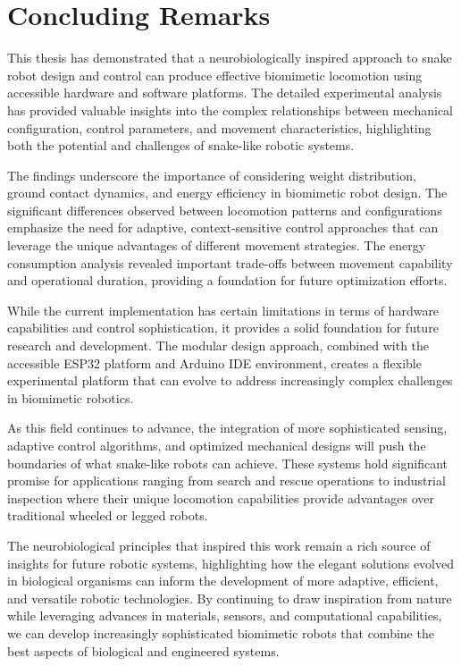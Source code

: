 \documentclass[12pt,a4paper]{report}
\begin{document}
\section{Concluding Remarks}
\label{sec:concludingRemarks}

This thesis has demonstrated that a neurobiologically inspired approach to snake robot design and control can produce effective biomimetic locomotion using accessible hardware and software platforms. The detailed experimental analysis has provided valuable insights into the complex relationships between mechanical configuration, control parameters, and movement characteristics, highlighting both the potential and challenges of snake-like robotic systems.

The findings underscore the importance of considering weight distribution, ground contact dynamics, and energy efficiency in biomimetic robot design. The significant differences observed between locomotion patterns and configurations emphasize the need for adaptive, context-sensitive control approaches that can leverage the unique advantages of different movement strategies. The energy consumption analysis revealed important trade-offs between movement capability and operational duration, providing a foundation for future optimization efforts.

While the current implementation has certain limitations in terms of hardware capabilities and control sophistication, it provides a solid foundation for future research and development. The modular design approach, combined with the accessible ESP32 platform and Arduino IDE environment, creates a flexible experimental platform that can evolve to address increasingly complex challenges in biomimetic robotics.

As this field continues to advance, the integration of more sophisticated sensing, adaptive control algorithms, and optimized mechanical designs will push the boundaries of what snake-like robots can achieve. These systems hold significant promise for applications ranging from search and rescue operations to industrial inspection where their unique locomotion capabilities provide advantages over traditional wheeled or legged robots.

The neurobiological principles that inspired this work remain a rich source of insights for future robotic systems, highlighting how the elegant solutions evolved in biological organisms can inform the development of more adaptive, efficient, and versatile robotic technologies. By continuing to draw inspiration from nature while leveraging advances in materials, sensors, and computational capabilities, we can develop increasingly sophisticated biomimetic robots that combine the best aspects of biological and engineered systems.
\end{document}
